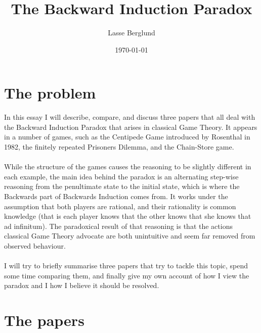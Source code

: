 \documentclass{article}
\title{The Backward Induction Paradox}
\author{Lasse Berglund}
\date{\today}
\begin{document}
\maketitle
\section{The problem}
In this essay I will describe, compare, and discuss three papers that all deal with the Backward Induction Paradox that arises in classical Game Theory. It appears in a number of games, such as the Centipede Game introduced by Rosenthal in 1982, the finitely repeated Prisoners Dilemma, and the Chain-Store game.
\\
\\
While the structure of the games causes the reasoning to be slightly different in each example, the main idea behind the paradox is an alternating step-wise reasoning from the penultimate state to the initial state, which is where the Backwards part of Backwards Induction comes from. It works under the assumption that both players are rational, and their rationality is common knowledge (that is each player knows that the other knows that she knows that ad infinitum). The paradoxical result of that reasoning is that the actions classical Game Theory advocate are both unintuitive and seem far removed from observed behaviour.
\\
\\
I will try to briefly summarise three papers that try to tackle this topic, spend some time comparing them, and finally give my own account of how I view the paradox and I how I believe it should be resolved. 





















\section{The papers}
\end{document}
